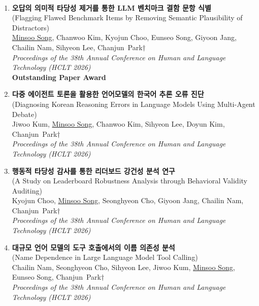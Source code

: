\documentclass[10pt,a4paper]{article}
\newcommand{\krfont}{}           %
\newcommand{\kr}[1]{{\krfont #1}}
\let\krfont\notoserifkr
\begin{document}
\par\vspace{0.4em}
\\[-0.6em]
\noindent{\color{gray}\rule{\linewidth}{0.4pt}}
\begin{enumerate}
    \item \small{\textbf{\kr{오답의 의미적 타당성 제거를 통한 LLM 벤치마크 결함 문항 식별}} \\
    (Flagging Flawed Benchmark Items by Removing Semantic Plausibility of Distractors) \\
    \underline{Minsoo Song}, Chanwoo Kim, Kyojun Choo, Eunseo Song, Giyoon Jang, Chailin Nam, Sihyeon Lee, \mbox{Chanjun Park$\dagger$} \\
    \textit{Proceedings of the 38th Annual Conference on Human and Language Technology (HCLT 2026)} \\
    \textbf{Outstanding Paper Award}}

    \item \small{\textbf{\kr{다중 에이전트 토론을 활용한 언어모델의 한국어 추론 오류 진단}} \\
    (Diagnosing Korean Reasoning Errors in Language Models Using Multi-Agent Debate) \\
    Jiwoo Kum, \underline{Minsoo Song}, Chanwoo Kim, Sihyeon Lee, Doyun Kim, \mbox{Chanjun Park$\dagger$} \\
    \textit{Proceedings of the 38th Annual Conference on Human and Language Technology (HCLT 2026)}}

    \item \small{\textbf{\kr{행동적 타당성 감사를 통한 리더보드 강건성 분석 연구}} \\
    (A Study on Leaderboard Robustness Analysis through Behavioral Validity Auditing) \\
    Kyojun Choo, \underline{Minsoo Song}, Seonghyeon Cho, Giyoon Jang, Chailin Nam, \mbox{Chanjun Park$\dagger$} \\
    \textit{Proceedings of the 38th Annual Conference on Human and Language Technology (HCLT 2026)}}

    \item \small{\textbf{\kr{대규모 언어 모델의 도구 호출에서의 이름 의존성 분석}} \\
    (Name Dependence in Large Language Model Tool Calling) \\
    Chailin Nam, Seonghyeon Cho, Sihyeon Lee, Jiwoo Kum, \underline{Minsoo Song}, Eunseo Song, \mbox{Chanjun Park$\dagger$} \\
    \textit{Proceedings of the 38th Annual Conference on Human and Language Technology (HCLT 2026)}}


\end{enumerate}
\end{document}
